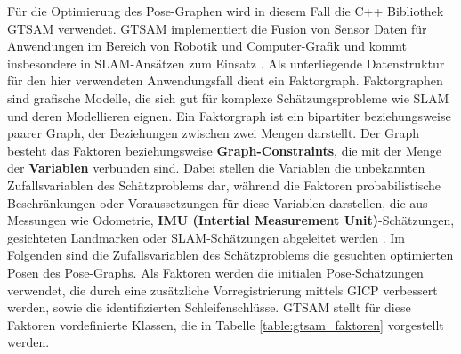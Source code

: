 Für die Optimierung des Pose-Graphen wird in diesem Fall die C++ Bibliothek GTSAM \cite{dellaert2012factor} verwendet. GTSAM implementiert die Fusion von Sensor Daten für Anwendungen im Bereich von Robotik und Computer-Grafik und kommt insbesondere in SLAM-Ansätzen zum Einsatz \cite{dellaert2012factor}. Als unterliegende Datenstruktur für den hier verwendeten Anwendungsfall dient ein Faktorgraph. Faktorgraphen sind grafische Modelle, die sich gut für komplexe Schätzungsprobleme wie SLAM und deren Modellieren eignen. Ein Faktorgraph ist ein bipartiter beziehungsweise paarer Graph, der Beziehungen zwischen zwei Mengen darstellt. Der Graph besteht das Faktoren beziehungsweise \textbf{Graph-Constraints}, die mit der Menge der \textbf{Variablen} verbunden sind. Dabei stellen die Variablen die unbekannten Zufallsvariablen des Schätzproblems dar, während die Faktoren probabilistische Beschränkungen oder Voraussetzungen für diese Variablen darstellen, die aus Messungen wie Odometrie, \textbf{IMU (Intertial Measurement Unit)}-Schätzungen, gesichteten Landmarken oder SLAM-Schätzungen abgeleitet werden \cite{dellaert2012factor}. Im Folgenden sind die Zufallsvariablen des Schätzproblems die gesuchten optimierten Posen des Pose-Graphs. Als Faktoren werden die initialen Pose-Schätzungen verwendet, die durch eine zusätzliche Vorregistrierung mittels GICP verbessert werden, sowie die identifizierten Schleifenschlüsse. GTSAM stellt für diese Faktoren vordefinierte Klassen, die in Tabelle \ref{table:gtsam_faktoren} vorgestellt werden.

